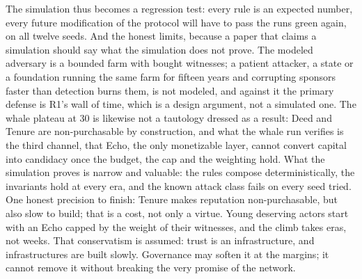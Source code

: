 The simulation thus becomes a regression test: every rule is an expected
number, every future modification of the protocol will have to pass the
runs green again, on all twelve seeds. And the honest limits, because a
paper that claims a simulation should say what the simulation does not
prove. The modeled adversary is a bounded farm with bought witnesses; a
patient attacker, a state or a foundation running the same farm for
fifteen years and corrupting sponsors faster than detection burns them,
is not modeled, and against it the primary defense is R1's wall of
time, which is a design argument, not a simulated one. The whale
plateau at 30 is likewise not a tautology dressed as a result: Deed and
Tenure are non-purchasable by construction, and what the whale run
verifies is the third channel, that Echo, the only monetizable layer,
cannot convert capital into candidacy once the budget, the cap and the
weighting hold. What the simulation proves is narrow and valuable: the
rules compose deterministically, the invariants hold at every era, and
the known attack class fails on every seed tried. One honest precision
to finish: Tenure makes
reputation non-purchasable, but also slow to build; that is a cost, not
only a virtue. Young deserving actors start with an Echo capped by the
weight of their witnesses, and the climb takes eras, not weeks. That
conservatism is assumed: trust is an infrastructure, and infrastructures
are built slowly. Governance may soften it at the margins; it cannot
remove it without breaking the very promise of the network.
